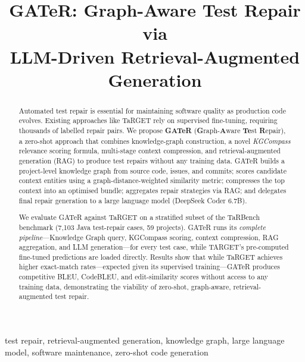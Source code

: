 \documentclass[conference,10pt]{IEEEtran}
\begin{document}
\title{GATeR: Graph-Aware Test Repair via\\LLM-Driven Retrieval-Augmented Generation}

\author{
}

\maketitle

\begin{abstract}
Automated test repair is essential for maintaining software quality as
production code evolves. Existing approaches like TaRGET rely on
supervised fine-tuning, requiring thousands of labelled repair pairs.
We propose \textbf{GATeR}
(\textbf{G}raph-\textbf{A}ware \textbf{Te}st \textbf{R}epair), a
zero-shot approach that combines knowledge-graph construction, a novel
\emph{KGCompass} relevance scoring formula, multi-stage context
compression, and retrieval-augmented generation (RAG) to produce test
repairs without any training data. GATeR builds a project-level
knowledge graph from source code, issues, and commits; scores candidate
context entities using a graph-distance-weighted similarity metric;
compresses the top context into an optimised bundle; aggregates repair
strategies via RAG; and delegates final repair generation to a large
language model (DeepSeek Coder 6.7B).

We evaluate GATeR against TaRGET on a stratified subset of the TaRBench
benchmark (7,103 Java test-repair cases, 59 projects). GATeR runs its
\emph{complete pipeline}---Knowledge Graph query, KGCompass scoring,
context compression, RAG aggregation, and LLM generation---for every
test case, while TARGET's pre-computed fine-tuned predictions are loaded
directly. Results show that while TaRGET achieves higher exact-match
rates---expected given its supervised training---GATeR produces
competitive BLEU, CodeBLEU, and edit-similarity scores without access to
any training data, demonstrating the viability of zero-shot,
graph-aware, retrieval-augmented test repair.
\end{abstract}

\begin{IEEEkeywords}
    test repair, retrieval-augmented generation, knowledge graph,
    large language model, software maintenance, zero-shot code generation
\end{IEEEkeywords}
\end{document}
